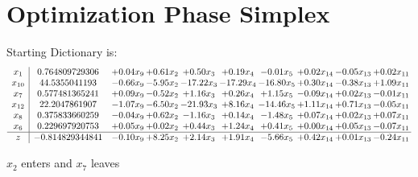 \documentclass[9pt]{article}
\begin{document}
\section{Optimization Phase Simplex}
Starting Dictionary is:
\[\begin{array}{c| c c@{\hskip 2pt} c@{\hskip 2pt} c@{\hskip 2pt} c@{\hskip 2pt} c@{\hskip 2pt} c@{\hskip 2pt} c@{\hskip 2pt} c@{\hskip 2pt} }
 x_{1}   &  0.764809729306 & +  0.04 x_{9} & +  0.61 x_{2} & +  0.50 x_{3} & +  0.19 x_{4} & -0.01 x_{5} & +  0.02 x_{14} & -0.05 x_{13} & +  0.02 x_{11}\\
 x_{10}   &  44.5355041193 & -0.66 x_{9} & -5.95 x_{2} & -17.22 x_{3} & -17.29 x_{4} & -16.80 x_{5} & +  0.30 x_{14} & -0.38 x_{13} & +  1.09 x_{11}\\
 x_{7}   &  0.577481365241 & +  0.09 x_{9} & -0.52 x_{2} & +  1.16 x_{3} & +  0.26 x_{4} & +  1.15 x_{5} & -0.09 x_{14} & +  0.02 x_{13} & -0.01 x_{11}\\
 x_{12}   &  22.2047861907 & -1.07 x_{9} & -6.50 x_{2} & -21.93 x_{3} & +  8.16 x_{4} & -14.46 x_{5} & +  1.11 x_{14} & +  0.71 x_{13} & -0.05 x_{11}\\
 x_{8}   &  0.375833660259 & -0.04 x_{9} & +  0.62 x_{2} & -1.16 x_{3} & +  0.14 x_{4} & -1.48 x_{5} & +  0.07 x_{14} & +  0.02 x_{13} & +  0.07 x_{11}\\
 x_{6}   &  0.229697920753 & +  0.05 x_{9} & +  0.02 x_{2} & +  0.44 x_{3} & +  1.24 x_{4} & +  0.41 x_{5} & +  0.00 x_{14} & +  0.05 x_{13} & -0.07 x_{11}\\
\hline
z    &  -0.814829344841 & -0.10 x_{9} & +  8.25 x_{2} & +  2.14 x_{3} & +  1.91 x_{4} & -5.66 x_{5} & +  0.42 x_{14} & +  0.01 x_{13} & -0.24 x_{11}\\
\end{array}\]


 $ x_{2} $ enters and $ x_{7} $ leaves 
\end{document}
